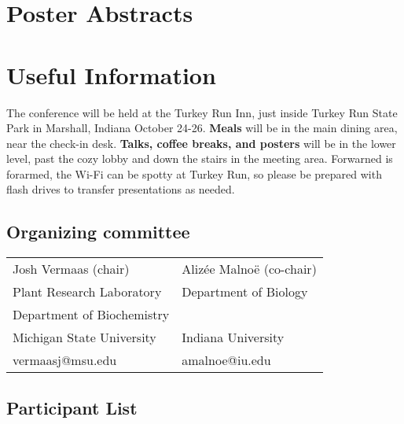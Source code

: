 \documentclass[
	openany, %
	parskip=full, %
	12pt, %
	letterpaper, %
]{conferencebooklet} %
\begin{document}
\chapter{Poster Abstracts} 
\begin{multicols}{3}
\begin{itemize}
	
\end{itemize}
\end{multicols}




 


\chapter{Useful Information}

The conference will be held at the Turkey Run Inn, just inside Turkey Run State Park in Marshall, Indiana October 24-26.
\textbf{Meals} will be in the main dining area, near the check-in desk. 
\textbf{Talks, coffee breaks, and posters} will be in the lower level, past the cozy lobby and down the stairs in the meeting area.
Forwarned is forarmed, the Wi-Fi can be spotty at Turkey Run, so please be prepared with flash drives to transfer presentations as needed.

\section{Organizing committee}

\begin{center}
	\begin{tabular}{ll}
	Josh Vermaas (chair)	&	Alizée Malnoë	 (co-chair) \\
		Plant Research Laboratory	&	Department of Biology \\
			Department of Biochemistry	&			\\
		Michigan State University	&		Indiana University \\
		vermaasj@msu.edu       		&	amalnoe@iu.edu\\
		
	\end{tabular}
\end{center}

\section{Participant List}
\end{document}
